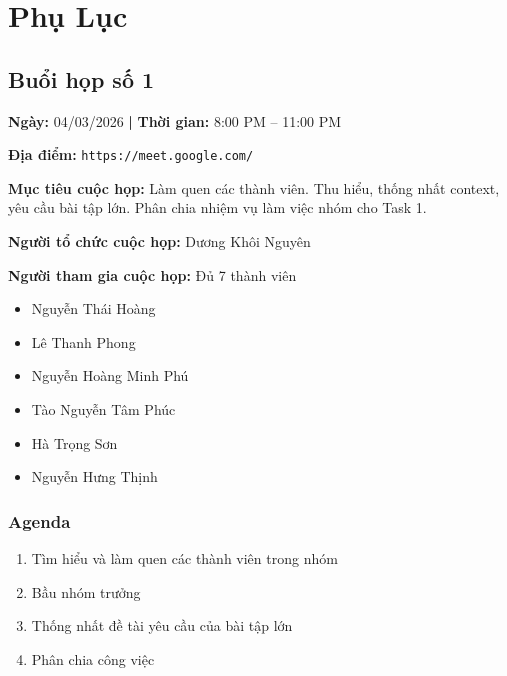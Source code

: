 \section*{Phụ Lục}

\subsection*{Buổi họp số 1}

\textbf{Ngày:} 04/03/2026 \textbf{|} \textbf{Thời gian:} 8:00 PM -- 11:00 PM 

\textbf{Địa điểm:} \texttt{https://meet.google.com/} 

\textbf{Mục tiêu cuộc họp:}
Làm quen các thành viên. Thu hiểu, thống nhất context, yêu cầu bài tập lớn. Phân chia nhiệm vụ làm việc nhóm cho Task 1.

\textbf{Người tổ chức cuộc họp:} Dương Khôi Nguyên

\textbf{Người tham gia cuộc họp:} Đủ 7 thành viên
\begin{itemize}
  \vspace{-10pt}
  \item Nguyễn Thái Hoàng
  \vspace{-10pt}
  \item Lê Thanh Phong
  \vspace{-10pt}
  \item Nguyễn Hoàng Minh Phú
  \vspace{-10pt}
  \item Tào Nguyễn Tâm Phúc
  \vspace{-10pt}
  \item Hà Trọng Sơn
  \vspace{-10pt}
  \item Nguyễn Hưng Thịnh
\end{itemize}

\subsubsection*{Agenda}
\begin{enumerate}
  \vspace{-10pt}
  \item Tìm hiểu và làm quen các thành viên trong nhóm
  \vspace{-10pt}
  \item Bầu nhóm trưởng
  \vspace{-10pt}
  \item Thống nhất đề tài yêu cầu của bài tập lớn
  \vspace{-10pt}
  \item Phân chia công việc
\end{enumerate}

